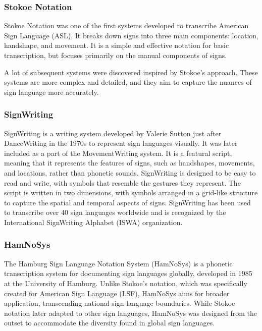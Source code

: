 \subsubsection{Stokoe Notation}

Stokoe Notation\cite{TODO} was one of the first systems developed to transcribe American Sign Language (ASL). It breaks down signs into three main components: location, handshape, and movement. It is a simple and effective notation for basic transcription, but focuses primarily on the manual components of signs.

A lot of subsequent systems were discovered inspired by Stokoe's approach. These systems are more complex and detailed, and they aim to capture the nuances of sign language more accurately.

\subsubsection{SignWriting}

SignWriting is a writing system developed by Valerie Sutton just after DanceWriting\cite{TODO} in the 1970s to represent sign languages visually. It was later included as a part of the MovementWriting\cite{TODO} system. It is a featural script, meaning that it represents the features of signs, such as handshapes, movements, and locations, rather than phonetic sounds. SignWriting is designed to be easy to read and write, with symbols that resemble the gestures they represent. The script is written in two dimensions, with symbols arranged in a grid-like structure to capture the spatial and temporal aspects of signs. SignWriting has been used to transcribe over 40 sign languages worldwide and is recognized by the International SignWriting Alphabet (ISWA) organization.


\subsubsection{HamNoSys}

The Hamburg Sign Language Notation System (HamNoSys) is a phonetic transcription system for documenting sign languages globally, developed in 1985 at the University of Hamburg. Unlike Stokoe's notation, which was specifically created for American Sign Language (LSF), HamNoSys aims for broader application, transcending national sign language boundaries. While Stokoe notation later adapted to other sign languages, HamNoSys was designed from the outset to accommodate the diversity found in global sign languages.

